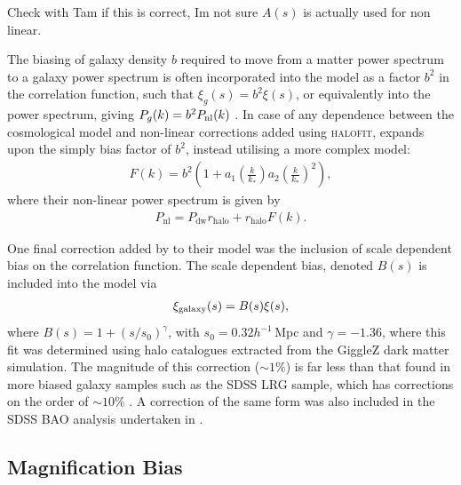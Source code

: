 \documentclass[titlesmallcaps, examinerscopy, copyrightpage]{uqthesis}
\newcommand{\red}{\color{red}}
\newcommand{\halofit}{\textsc{halofit}}
\begin{document}
{\red Check with Tam if this is correct, Im not sure $A(s)$ is actually used for non linear}.

The biasing of galaxy density $b$ required to move from a matter power spectrum to a galaxy power spectrum is often incorporated into the model as a factor $b^2$ in the correlation function, such that $\xi_g(s) = b^2 \xi(s)$, or equivalently into the power spectrum, giving $P_g(k) = b^2 P_{\rm{nl}}(k)$ \citep{BlakeDavis2011, ChuangWang2012, XuPadmanabhan2012, AndersonAubourg2012, MontesanoSanchezPhelps2012}. In case of any dependence between the cosmological model and non-linear corrections added using \halofit{}, \citet{ReidPercival2010} expands upon the simply bias factor of $b^2$, instead utilising a more complex model:
\begin{align}
F(k) = b^2\left(1 + a_1 \left(\frac{k}{k_*}\right) a_2 \left( \frac{k}{k_*} \right)^2 \right),
\end{align}
where their non-linear power spectrum is given by 
\begin{align}
P_{\text{nl}} = P_{\text{dw}} r_{\text{halo}} + r_{\text{halo}} F(k).
\end{align}

One final correction added by \citet{BlakeDavis2011} to their model was the inclusion of scale dependent bias on the correlation function. The scale dependent bias, denoted $B(s)$ is included into the model via
\begin{align}
\xi_{\rm{galaxy}}(s) = B(s) \xi(s),
\end{align}
where $B(s) = 1 + (s/s_0)^\gamma$, with $s_0 = 0.32 h^{-1}\,$Mpc and $\gamma = -1.36$, where this fit was determined using halo catalogues extracted from the GiggleZ dark matter simulation. The magnitude of this correction ($\sim 1\%$) is far less than that found in more biased galaxy samples such as the SDSS LRG sample, which has corrections on the order of $\sim 10\%$ \citep{EisensteinZehavi2005}. A correction of the same form was also included in the SDSS BAO analysis undertaken in \citet{VeropalumboMarulliMoscardini2014}.


\subsection{Magnification Bias}
\end{document}
